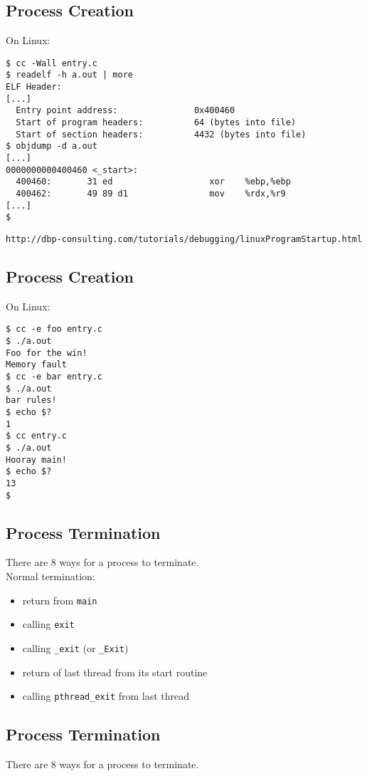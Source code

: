 \documentclass[xga]{xdvislides}
\begin{document}
\subsection{Process Creation}
On Linux:
\begin{verbatim}
$ cc -Wall entry.c
$ readelf -h a.out | more
ELF Header:
[...]
  Entry point address:               0x400460
  Start of program headers:          64 (bytes into file)
  Start of section headers:          4432 (bytes into file)
$ objdump -d a.out
[...]
0000000000400460 <_start>:
  400460:       31 ed                   xor    %ebp,%ebp
  400462:       49 89 d1                mov    %rdx,%r9
[...]
$
\end{verbatim}

\verb+http://dbp-consulting.com/tutorials/debugging/linuxProgramStartup.html+



\subsection{Process Creation}
On Linux:
\begin{verbatim}
$ cc -e foo entry.c
$ ./a.out
Foo for the win!
Memory fault
$ cc -e bar entry.c
$ ./a.out
bar rules!
$ echo $?
1
$ cc entry.c
$ ./a.out
Hooray main!
$ echo $?
13
$
\end{verbatim}

\subsection{Process Termination}
There are 8 ways for a process to terminate.
\\

Normal termination:
\begin{itemize}
	\item return from {\tt main}
	\item calling {\tt exit}
	\item calling {\tt \_exit} (or {\tt\_Exit})
	\item return of last thread from its start routine
	\item calling {\tt pthread\_exit} from last thread
\end{itemize}
\vspace{.25in}

\subsection{Process Termination}
There are 8 ways for a process to terminate.
\\
\end{document}
